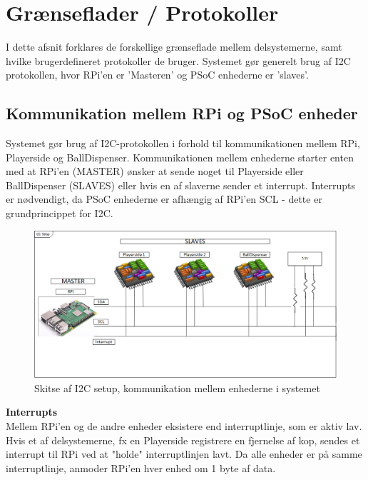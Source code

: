 \documentclass[Arkitektur/System_main.tex]{subfiles}
\begin{document}
\section{Grænseflader / Protokoller}
I dette afsnit forklares de forskellige grænseflade mellem delsystemerne, samt hvilke brugerdefineret protokoller de bruger. Systemet gør generelt brug af I2C protokollen, hvor RPi'en er 'Masteren' og PSoC enhederne er 'slaves'. 


\subsection{Kommunikation mellem RPi og PSoC enheder}


Systemet gør brug af I2C-protokollen i forhold til kommunikationen mellem RPi, Playerside og BallDispenser. Kommunikationen mellem enhederne starter enten med at RPi'en (MASTER) ønsker at sende noget til Playerside eller BallDispenser (SLAVES) eller hvis en af slaverne sender et interrupt. Interrupts er nødvendigt, da PSoC enhederne er afhængig af RPi'en SCL - dette er grundprincippet for I2C. 

\begin{figure}[H]
    \centering
    \includegraphics[width=\textwidth]{Arkitektur/Grenseflader/Graphics/I2C.png}
    \caption{Skitse af I2C setup, kommunikation mellem enhederne i systemet}
    \label{fig:i2c_setup}
\end{figure}

\textbf{Interrupts}
\\Mellem RPi'en og de andre enheder eksistere end interruptlinje, som er aktiv lav. Hvis et af delsystemerne, fx en Playerside registrere en fjernelse af kop, sendes et interrupt til RPi ved at "holde" interruptlinjen lavt. Da alle enheder er på samme interruptlinje, anmoder RPi'en hver enhed om 1 byte af data.
\end{document}
